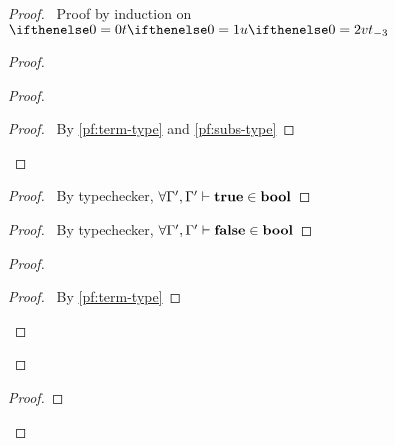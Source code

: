 \documentclass[a4paper]{article}
\begin{document}
\begin{proof}
  \assume{\begin{enumerate}
    \item $\judge {\ctxtExtend \aContext \aVar {\aType[1]}} \aTerm \aType$ \label{pf:term-type}
    \item $\judge \aContext \aBase {\aType[1]}$ \label{pf:subs-type}
  \end{enumerate}}
  \prove{$\judge \aContext {\subs \aTerm {\envextend \envid \aVar \aBase}} \aType$}
  \pfsketch\ Proof by induction on $\aTerm$
  \begin{proof}
    \begin{proof}
      \qedstep
      \begin{proof}
        \pf\ By \ref{pf:term-type} and \ref{pf:subs-type}
      \end{proof}
    \end{proof}
    \begin{proof}
      \pf\ By typechecker, $\forall \Gamma', \Gamma' \vdash \textbf{true} \in \textbf{bool}$
    \end{proof}
    \begin{proof}
      \pf\ By typechecker, $\forall \Gamma', \Gamma' \vdash \textbf{false} \in \textbf{bool}$
    \end{proof}
    \begin{proof}
      \qedstep
      \begin{proof}
        \pf\ By \ref{pf:term-type}
      \end{proof}
    \end{proof}
  \end{proof}
  \begin{proof}
  \end{proof}
\end{proof}
\end{document}
